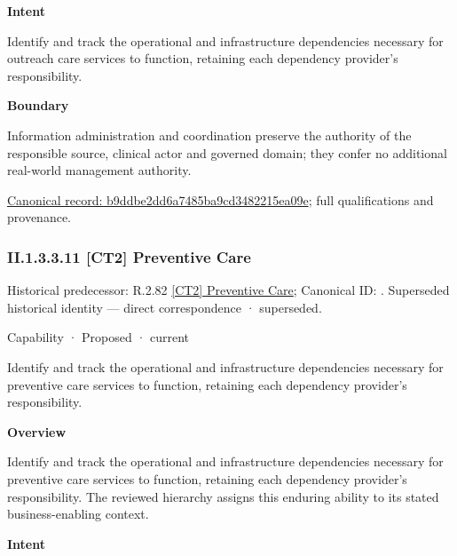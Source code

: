 \textbf{Intent}



Identify and track the operational and infrastructure dependencies necessary for outreach care services to function, retaining each dependency provider's responsibility.



\textbf{Boundary}



Information administration and coordination preserve the authority of the responsible source, clinical actor and governed domain; they confer no additional real-world management authority.


{\footnotesize \href{../../../../../../../continuum/strategy/capability/b9ddbe2dd6a7485ba9cd3482215ea09e.md}{Canonical record: b9ddbe2dd6a7485ba9cd3482215ea09e}; full qualifications and provenance.}\par
\subsubsection*{II.1.3.3.11 [CT2] Preventive Care}
\label{navigation:II.1.3.3.11}

{\small Historical predecessor: R.2.82 \hyperref[element:97f0d1acc37b4ca994c6c1ca006f2daa]{[CT2] Preventive Care}; Canonical ID: \texttt{}. Superseded historical identity — direct correspondence · superseded.}\par
\label{element:dfdc4f0273ba4910848b3b65c9ef6ab2}
{\small Capability · Proposed · current}\par

Identify and track the operational and infrastructure dependencies necessary for preventive care services to function, retaining each dependency provider's responsibility.



\textbf{Overview}



Identify and track the operational and infrastructure dependencies necessary for preventive care services to function, retaining each dependency provider's responsibility. The reviewed hierarchy assigns this enduring ability to its stated business-enabling context.



\textbf{Intent}



